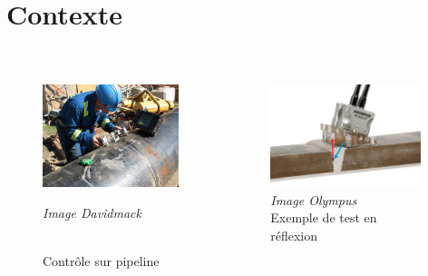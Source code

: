 \begin{frame}
	\titlepage 
\end{frame}


\section{Contexte}

\subsection*{}
\begin{frame}{\insertsectionhead}
\vspace{-0.2cm}
		\begin{columns}
			\centering
			\begin{figure}
				\includegraphics[height=3cm]{img/us_test.jpg}\\
				{\tiny{\raggedright \itshape Image Davidmack}\\ \centering \scriptsize{Contrôle sur pipeline}}
			\end{figure}		
			\begin{figure}
				\includegraphics[height=3cm]{img/olympus.jpg}\\
				 {\tiny{\itshape Image Olympus}\\ \centering			\scriptsize{Exemple de test en réflexion}}
			\end{figure}
		\end{columns}	
		\vspace{0.4cm}	


\end{frame}
